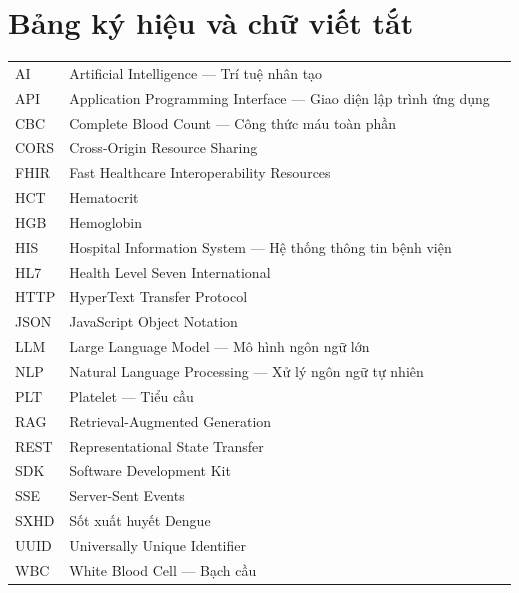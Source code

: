 \documentclass[a4paper,13pt,3p,twoside,openany]{report}
\theoremstyle{definition}
\theoremstyle{remark}
\theoremstyle{definition}
\begin{document}
\tableofcontents
\thispagestyle{empty}
\cleardoublepage

\renewcommand{\listfigurename}{DANH MỤC HÌNH VẼ}
{\let\oldnumberline\numberline
\renewcommand{\numberline}{Hình~\oldnumberline}
\listoffigures}
\newpage

\renewcommand{\listtablename}{DANH MỤC BẢNG BIỂU}
{\let\oldnumberline\numberline
\renewcommand{\numberline}{Bảng~\oldnumberline}
\listoftables}

\chapter*{Bảng ký hiệu và chữ viết tắt}

\begin{tabular}{@{\hspace{-0.1cm}} l @{\hspace{1.2cm}} p{11.5cm} l}
AI    & Artificial Intelligence --- Trí tuệ nhân tạo \\
API   & Application Programming Interface --- Giao diện lập trình ứng dụng \\
CBC   & Complete Blood Count --- Công thức máu toàn phần \\
CORS  & Cross-Origin Resource Sharing \\
FHIR  & Fast Healthcare Interoperability Resources \\
HCT   & Hematocrit \\
HGB   & Hemoglobin \\
HIS   & Hospital Information System --- Hệ thống thông tin bệnh viện \\
HL7   & Health Level Seven International \\
HTTP  & HyperText Transfer Protocol \\
JSON  & JavaScript Object Notation \\
LLM   & Large Language Model --- Mô hình ngôn ngữ lớn \\
NLP   & Natural Language Processing --- Xử lý ngôn ngữ tự nhiên \\
PLT   & Platelet --- Tiểu cầu \\
RAG   & Retrieval-Augmented Generation \\
REST  & Representational State Transfer \\
SDK   & Software Development Kit \\
SSE   & Server-Sent Events \\
SXHD  & Sốt xuất huyết Dengue \\
UUID  & Universally Unique Identifier \\
WBC   & White Blood Cell --- Bạch cầu \\
\end{tabular}
\end{document}
